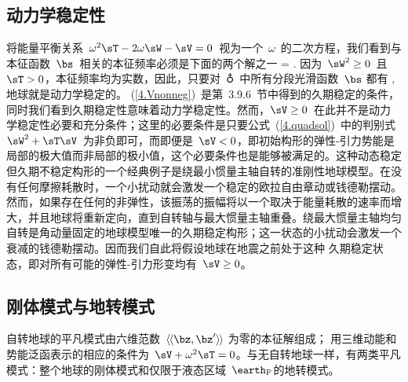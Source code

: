 {\subsection{动力学稳定性}
%
%
\renewcommand{\thesubsection}{\arabic{chapter}.\arabic{section}.\arabic{subsection}}

将能量平衡关系~$\omega^2\sT-2\omega\sW-\sV=0$~视为一个~$\omega$~的二次方程，我们看到与本征函数~$\bs$~相关的本征频率必须是下面的两个解之一
\eq
\label{4.quadsol}
\omega=
{\sT}.
\en
因为~$\sW^2\geq 0$~且~$\sT > 0$，本征频率均为实数，因此，只要对~$\earth$~中所有分段光滑函数~$\bs$ 都有
\eq
\label{4.Vnonneg}
\sV{},
\en
地球就是动力学稳定的。
(\ref{4.Vnonneg})~是第~3.9.6~节中得到的久期稳定的条件，同时我们看到久期稳定性意味着动力学稳定性。然而，$\sV\geq 0$~在此并不是动力学稳定性必要和充分条件；这里的必要条件是只要公式~(\ref{4.quadsol})~中的判别式~$\sW^2+\sT\sV$~为非负即可，而即便是~$\sV<0$，即初始构形的弹性-引力势能是局部的极大值而非局部的极小值，这个必要条件也是能够被满足的。这种动态稳定但久期不稳定构形的一个经典例子是绕最小惯量主轴自转的准刚性地球模型。在没有任何摩擦耗散时，一个小扰动就会激发一个稳定的欧拉自由章动或钱德勒摆动。然而，如果存在任何的非弹性，该振荡的振幅将以一个取决于能量耗散的速率而增大，并且地球将重新定向，直到自转轴与最大惯量主轴重叠。绕最大惯量主轴均匀自转是角动量固定的地球模型唯一的久期稳定构形；这一状态的小扰动会激发一个衰减的钱德勒摆动。因而我们自此将假设地球在地震之前处于这种
久期稳定状态，即对所有可能的弹性-引力形变均有~$\sV\geq 0$。
%
%
%
%

\renewcommand{\thesubsection}{$\!\!\!\raise1.3ex\hbox{$\star$}\!\!$
\arabic{chapter}.\arabic{section}.\arabic{subsection}}
\subsection{刚体模式与地转模式}
%
%
%
%
\label{4.sec.rottriv}
\renewcommand{\thesubsection}{\arabic{chapter}.\arabic{section}.\arabic{subsection}}

自转地球的平凡模式由六维范数~$\langle_{\!}\langle\bz,\bz'\rangle_{\!}\rangle$ 为零的本征解组成；
%
%
用三维动能和势能泛函表示的相应的条件为~$\sV+\omega^2\sT=0$。与无自转地球一样，有两类平凡模式：整个地球的刚体模式和仅限于液态区域~$\earth_{\rm F}$的地转模式。

}
